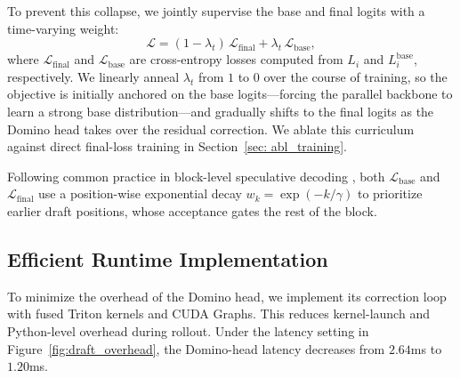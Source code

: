 To prevent this collapse, we jointly supervise the base and final logits with a time-varying weight:
  \[
  \mathcal{L}
  =
  (1-\lambda_t)\,\mathcal{L}_{\mathrm{final}}
  +
  \lambda_t\,\mathcal{L}_{\mathrm{base}},
  \]
where \(\mathcal{L}_{\mathrm{final}}\) and \(\mathcal{L}_{\mathrm{base}}\) are cross-entropy losses computed from \(L_i\) and \(L_i^{\mathrm{base}}\), respectively. We linearly anneal \(\lambda_t\) from
\(1\) to \(0\) over the course of training, so the objective is initially anchored on the base logits---forcing the parallel backbone to learn a strong base distribution---and gradually shifts to the final
logits as the Domino head takes over the residual correction. We ablate this curriculum against direct final-loss training in Section~\ref{sec: abl_training}.

Following common practice in block-level speculative decoding \citep{chen2026dflash}, both \(\mathcal{L}_{\mathrm{base}}\) and \(\mathcal{L}_{\mathrm{final}}\) use a position-wise exponential
decay \(w_k = \exp(-k/\gamma)\) to prioritize earlier draft positions, whose acceptance gates the rest of the block.
  
\subsection{Efficient Runtime Implementation}
\label{sec:runtime_optimization}

To minimize the overhead of the Domino head, we implement its correction loop with fused Triton kernels and CUDA Graphs. This reduces kernel-launch and Python-level overhead during rollout. Under the latency setting in Figure~\ref{fig:draft_overhead}, the Domino-head latency decreases from \(2.64\)ms to \(1.20\)ms.
